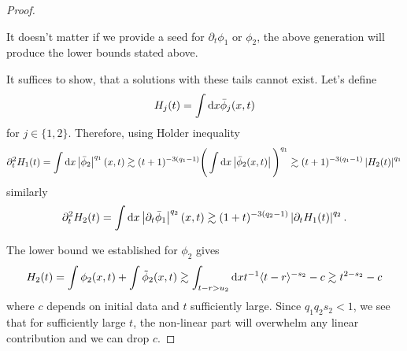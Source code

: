 \documentclass[11pt, oneside]{amsart}
\begin{document}
\begin{proof}
		\begin{remark}\label{creation of tails}
			It doesn't matter if we provide a seed for $\partial_t\phi_1$ or $\phi_2$, the above generation will produce the lower bounds stated above.
		\end{remark}
		
		
		
		
		
		
		It suffices to show, that a solutions with these tails cannot exist. Let's define
		\begin{equation*}
			\begin{gathered}
				H_j(t)=\int\mathrm{d} x \bar{\phi}_j(x,t)
			\end{gathered}
		\end{equation*}
		for $j\in\{1,2\}$. Therefore, using Holder inequality
		\begin{equation}\label{H1 bound}
			\begin{gathered}
				\partial_t^2H_1(t)=\int\mathrm{d} x \left\lvert \bar{\phi}_2\right\rvert^{q_1}(x,t)\gtrsim (t+1)^{-3(q_1-1)}\Bigg(\int\mathrm{d} x \left\lvert \bar{\phi}_2(x,t)\right\rvert\Bigg)^{q_1}\gtrsim (t+1)^{-3(q_1-1)}\left\lvert H_2(t)\right\rvert^{q_1}
			\end{gathered}
		\end{equation}
		similarly
		\begin{equation}\label{H2 bound}
			\begin{gathered}
				\partial_t^2 H_2(t)=\int\mathrm{d} x \left\lvert \partial_t\bar{\phi}_1\right\rvert^{q_2}(x,t)\gtrsim(1+t)^{-3(q_2-1)}\left\lvert \partial_tH_1(t)\right\rvert^{q_2}.
			\end{gathered}
		\end{equation}
		
		The lower bound we established for $\phi_2$ gives
		\begin{equation*}
			\begin{gathered}
				H_2(t)=\int \phi_2(x,t)+\int\tilde{\phi}_2(x,t)\gtrsim \int_{t-r>u_2}\mathrm{d} x t^{-1}\langle t-r \rangle^{-s_2}-c\gtrsim t^{2-s_2}-c
			\end{gathered}
		\end{equation*}
		where $c$ depends on initial data and $t$ sufficiently large. Since $q_1q_2s_2<1$, we see that for sufficiently large $t$, the non-linear part will overwhelm any linear contribution and we can drop $c$.
		

\end{proof}
\end{document}
